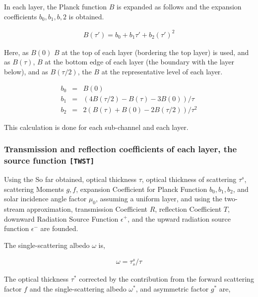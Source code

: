 In each layer, the Planck function \(B\) is expanded as follows and the expansion coefficients \(b_0, b_1, b,2\) is obtained. 

\begin{eqnarray}
  B(\tau') = b_0 + b_1 \tau' + b_2 \left(\tau'\right)^2
\end{eqnarray}

 Here, as \(B(0)\) \(B\) at the top of each layer (bordering the top layer) is used, and as
\(B(\tau)\), \(B\) at the bottom edge of each layer (the boundary with
the layer below), and as \(B(\tau/2)\), the \(B\) at the representative
level of each layer.

\begin{eqnarray}
  b_0 & = & B(0) \nonumber \\
  b_1 & = & ( 4B(\tau/2) - B(\tau) - 3B(0) )/\tau  \\
  b_2 & = & 2 ( B(\tau) + B(0) - 2B(\tau/2) )/\tau^2  \nonumber
\end{eqnarray}

This calculation is done for each sub-channel and each layer.

\hypertarget{transmission-and-reflection-coefficients-of-each-layer-the-source-function-twst}{%
\subsubsection{\texorpdfstring{Transmission and reflection coefficients
of each layer, the source function
\texttt{{[}TWST{]}}}{Transmission and reflection coefficients of each layer, the source function {[}TWST{]}}}\label{transmission-and-reflection-coefficients-of-each-layer-the-source-function-moduletwst}}

Using the So far obtained, optical thickness \(\tau\), optical thickness of
scattering \(\tau^s\), scattering Moments \(g, f\), expansion
Coefficient for Planck Function \(b_0, b_1, b_2\), and solar
incidence angle factor \(\mu_0\), assuming a uniform layer, and using
the two-stream approximation, transmission Coefficient \(R\), reflection
Coefficient \(T\), downward Radiation Source Function \(\epsilon^+\), and the upward radiation source function \(\epsilon^-\) are founded.

The single-scattering albedo \(\omega\) is,

\begin{eqnarray}
  \omega = \tau_s^s/\tau
\end{eqnarray}

The optical thickness \(\tau^*\) corrected by the contribution from the forward scattering factor \(f\) and the single-scattering albedo \(\omega^*\), and asymmetric factor \(g^*\) are,

